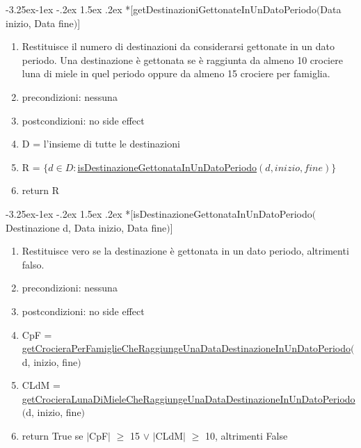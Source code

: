 \documentclass{article}
\makeatletter
\renewcommand\subsection{\@startsection{subsection}{2}{\z@}%
                                     {-3.25ex\@plus -1ex \@minus -.2ex}%
                                     {1.5ex \@plus .2ex}%
                                     {\normalfont\normalsize\bfseries}}
\makeatother
\begin{document}
\subsection*{\label{sec:OperazioneGetDestinazioniGettonateInUnDatoPeriodo}[getDestinazioniGettonateInUnDatoPeriodo$($Data inizio, Data fine$)$]}
\begin{enumerate}
    \item Restituisce il numero di destinazioni da considerarsi gettonate in un dato periodo. Una destinazione è gettonata se è raggiunta da almeno 10 crociere luna di miele in quel periodo oppure da almeno 15 crociere per famiglia.
    \item precondizioni: nessuna
    \item postcondizioni: no side effect
    \item D = l'insieme di tutte le destinazioni
    \item R = $\{d \in D: $\hyperref[sec:OperazioneIsDestinazioneGettonataInUnDatoPeriodo]{isDestinazioneGettonataInUnDatoPeriodo}$(d, inizio, fine)\}$
    \item return R
\end{enumerate}

\subsection*{\label{sec:OperazioneIsDestinazioneGettonataInUnDatoPeriodo}[isDestinazioneGettonataInUnDatoPeriodo$($Destinazione d, Data inizio, Data fine$)$]}
\begin{enumerate}
    \item Restituisce vero se la destinazione è gettonata in un dato periodo, altrimenti falso.
    \item precondizioni: nessuna
    \item postcondizioni: no side effect
    \item CpF = \hyperref[sec:OperazioneGetCrocieraPerFamiglieCheRaggiungeUnaDataDestinazioneInUnDatoPeriodo]{getCrocieraPerFamiglieCheRaggiungeUnaDataDestinazioneInUnDatoPeriodo}$($d, inizio, fine$)$
    \item CLdM = \hyperref[sec:OperazioneGetCrocieraLunaDiMieleCheRaggiungeUnaDataDestinazioneInUnDatoPeriodo]{getCrocieraLunaDiMieleCheRaggiungeUnaDataDestinazioneInUnDatoPeriodo}$($d, inizio, fine$)$
    \item return True se $|$CpF$|$ $\geq$ 15 $\lor$ $|$CLdM$|$ $\geq$ 10, altrimenti False
\end{enumerate}
\end{document}
